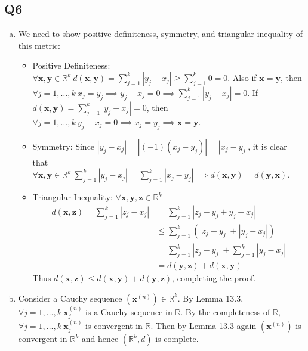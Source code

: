 \documentclass[12pt,lettersize]{article}
\newcommand{\R}{\mathbb{R}}
\begin{document}
	\subsection*{Q6}
	\begin{enumerate}[(a)]
		\item We need to show positive definiteness, symmetry, and triangular inequality of this metric:
		\begin{itemize}
			\item Positive Definiteness: $\forall \mathbf{x,y}\in\R^k\ d(\mathbf{x},\mathbf{y})=\sum_{j=1}^{k}|y_j-x_j|\geq\sum_{j=1}^{k}0=0$. Also if $\mathbf{x}=\mathbf{y}$, then $\forall j=1,\dots,k\ x_j=y_j\implies y_j-x_j=0\implies\sum_{j=1}^{k}|y_j-x_j|=0$. If $d(\mathbf{x},\mathbf{y})=\sum_{j=1}^{k}|y_j-x_j|=0$, then $\forall j=1,\dots,k\ y_j-x_j=0\implies x_j=y_j\implies \mathbf{x}=\mathbf{y}$.
			\item Symmetry: Since $|y_j-x_j|=|(-1)(x_j-y_j)|=|x_j-y_j|$, it is clear that $\forall \mathbf{x,y}\in\R^k\ \sum_{j=1}^{k}|y_j-x_j|=\sum_{j=1}^{k}|x_j-y_j|\implies d(\mathbf{x},\mathbf{y})=d(\mathbf{y},\mathbf{x})$.
			\item Triangular Inequality: $\forall \mathbf{x,y,z}\in\R^k$
			\begin{align*}
				d(\mathbf{x,z})=\sum_{j=1}^{k}|z_j-x_j| &= \sum_{j=1}^{k}|z_j-y_j+y_j-x_j|\\
														&\leq \sum_{j=1}^{k}(|z_j-y_j|+|y_j-x_j|)\\
														&= \sum_{j=1}^{k}|z_j-y_j|+\sum_{j=1}^{k}|y_j-x_j|\\
														&= d(\mathbf{y,z})+d(\mathbf{x,y})
			\end{align*}
			Thus $d(\mathbf{x,z})\leq d(\mathbf{x,y})+d(\mathbf{y,z})$, completing the proof.
		\end{itemize}
		\item Consider a Cauchy sequence $(\mathbf{x}^{(n)})\in\R^k$. By Lemma 13.3, $\forall j=1,\dots,k\ \mathbf{x}^{(n)}_j$ is a Cauchy sequence in $\R$. By the completeness of $\R$, $\forall j=1,\dots,k\ \mathbf{x}^{(n)}_j$ is convergent in $\R$. Then by Lemma 13.3 again $(\mathbf{x}^{(n)})$ is convergent in $\R^k$ and hence $(\R^k,d)$ is complete.
	\end{enumerate}
	\newpage
	
\end{document}
